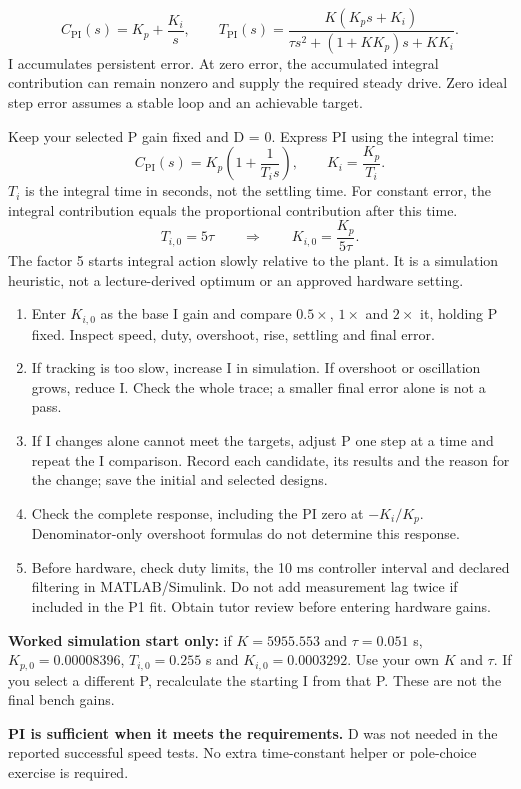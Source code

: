 \documentclass[10pt,a4paper]{article}
\newcommand{\sect}[1]{\par\vspace{5pt}{\fontsize{13}{15.4}\selectfont\color{accent}\bfseries #1}\par\vspace{2pt}}
\newcommand{\sub}[1]{\par\vspace{3pt}{\bfseries #1}\par\vspace{1pt}}
\begin{document}
\sect{3. Add I and tune PI in simulation}
\[
C_{\mathrm{PI}}(s)=K_p+\frac{K_i}{s},\qquad
T_{\mathrm{PI}}(s)=\frac{K(K_ps+K_i)}{\tau s^2+(1+KK_p)s+KK_i}.
\]
I accumulates persistent error. At zero error, the accumulated integral contribution can remain nonzero and supply the required steady drive. Zero ideal step error assumes a stable loop and an achievable target.
\sub{Choose an initial I gain, then refine}
Keep your selected P gain fixed and D = 0. Express PI using the integral time:
\[
C_{\mathrm{PI}}(s)=K_p\!\left(1+\frac{1}{T_i s}\right),\qquad K_i=\frac{K_p}{T_i}.
\]
$T_i$ is the integral time in seconds, not the settling time. For constant error, the integral contribution equals the proportional contribution after this time.
\[
T_{i,0}=5\tau\qquad\Longrightarrow\qquad\boxed{K_{i,0}=\frac{K_p}{5\tau}.}
\]
The factor 5 starts integral action slowly relative to the plant. It is a simulation heuristic, not a lecture-derived optimum or an approved hardware setting.
\begin{enumerate}
\item Enter $K_{i,0}$ as the base I gain and compare $0.5\times$, $1\times$ and $2\times$ it, holding P fixed. Inspect speed, duty, overshoot, rise, settling and final error.
\item If tracking is too slow, increase I in simulation. If overshoot or oscillation grows, reduce I. Check the whole trace; a smaller final error alone is not a pass.
\item If I changes alone cannot meet the targets, adjust P one step at a time and repeat the I comparison. Record each candidate, its results and the reason for the change; save the initial and selected designs.
\item Check the complete response, including the PI zero at $-K_i/K_p$. Denominator-only overshoot formulas do not determine this response.
\item Before hardware, check duty limits, the 10 ms controller interval and declared filtering in MATLAB/Simulink. Do not add measurement lag twice if included in the P1 fit. Obtain tutor review before entering hardware gains.
\end{enumerate}
\textbf{Worked simulation start only:} if $K=5955.553$ and $\tau=0.051$ s, $K_{p,0}=0.00008396$, $T_{i,0}=0.255$ s and $K_{i,0}=0.0003292$. Use your own $K$ and $\tau$. If you select a different P, recalculate the starting I from that P. These are not the final bench gains.

\textbf{PI is sufficient when it meets the requirements.} D was not needed in the reported successful speed tests. No extra time-constant helper or pole-choice exercise is required.
\end{document}
